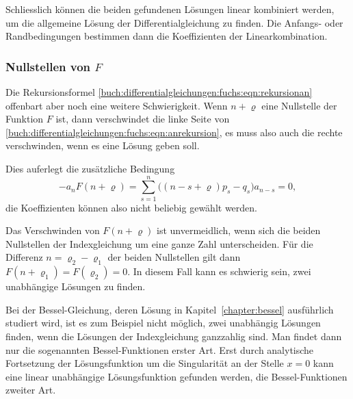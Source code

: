 Schliesslich können die beiden gefundenen Lösungen linear kombiniert
werden, um die allgemeine Lösung der Differentialgleichung zu finden.
Die Anfangs- oder Randbedingungen bestimmen dann die Koeffizienten
der Linearkombination.

%
%
\subsubsection{Nullstellen von $F$}
Die Rekursionsformel
\eqref{buch:differentialgleichungen:fuchs:eqn:rekursionan}
offenbart aber noch eine weitere Schwierigkeit.
Wenn $n+\varrho$ eine Nullstelle der Funktion $F$ ist, dann verschwindet
die linke Seite von
\eqref{buch:differentialgleichungen:fuchs:eqn:anrekursion},
es muss also auch die rechte verschwinden, wenn es eine Lösung
geben soll.

Dies auferlegt die zusätzliche Bedingung
\[
-
a_n
F(n+\varrho)
=
\sum_{s=1}^n
\bigl(
(n-s+\varrho)p_s
-
q_s
\bigr)
a_{n-s}
=
0,
\]
die Koeffizienten können also nicht beliebig gewählt werden.

Das Verschwinden von $F(n+\varrho)$ ist unvermeidlich, wenn sich die
beiden Nullstellen der Indexgleichung um eine ganze Zahl unterscheiden.
Für die Differenz $n=\varrho_2-\varrho_1$ der beiden Nullstellen gilt
dann $F(n+\varrho_1)=F(\varrho_2)=0$.
In diesem Fall kann es schwierig sein, zwei unabhängige Lösungen zu
finden.

Bei der Bessel-Gleichung, deren Lösung in Kapitel~\ref{chapter:bessel}
ausführlich studiert wird, ist es zum Beispiel nicht möglich, 
zwei unabhängig Lösungen finden, wenn die Lösungen der Indexgleichung
ganzzahlig sind.
Man findet dann nur die sogenannten Bessel-Funktionen erster Art.
Erst durch analytische Fortsetzung der Lösungsfunktion um die
Singularität an der Stelle $x=0$ kann eine linear unabhängige
Lösungsfunktion gefunden werden, die Bessel-Funktionen zweiter Art.



